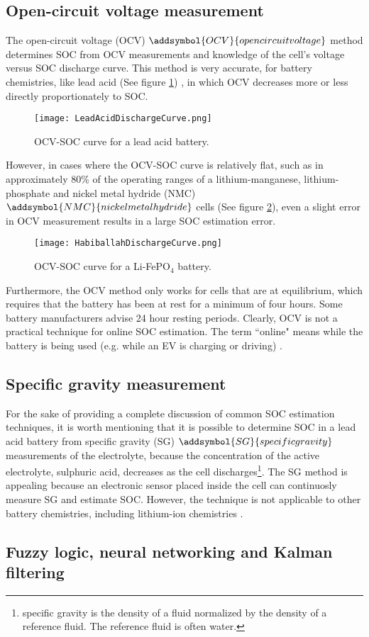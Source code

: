 		\subsection{Open-circuit voltage measurement}
The open-circuit voltage (OCV)  $\addsymbol{OCV}{open circuit voltage}$ method determines SOC from OCV measurements and knowledge of the cell's voltage versus SOC discharge curve.  This method is very accurate, for battery chemistries, like lead acid (See figure \ref{fig:LeadAcidDischargeCurve}) , in which OCV decreases more or less directly proportionately to SOC. 
\begin{figure}[H]
\centering
\texttt{[image: LeadAcidDischargeCurve.png]}
\caption{OCV-SOC curve for a lead acid battery.
\label{fig:LeadAcidDischargeCurve}
\cite{BUSOCDetermination}}
\end{figure}
However, in cases where the OCV-SOC curve is relatively flat, such as in approximately 80\% of the operating ranges of a lithium-manganese, lithium-phosphate and nickel metal hydride (NMC) $\addsymbol{NMC}{nickel metal hydride}$ cells \cite{MeasureSOC} (See figure \ref{fig:dischargeCurve}), even a slight error in OCV measurement results in a large SOC estimation error. 
\begin{figure}[H]
\centering
\texttt{[image: HabiballahDischargeCurve.png]}
\caption{OCV-SOC curve for a Li-FePO$_{4}$ battery.
\label{fig:dischargeCurve}
\cite[p.~8]{HabiballahRahimi-EichiUnnatiOhjaFedericoBaronti2013}}
\end{figure}
Furthermore, the OCV method only works for cells that are at equilibrium, which requires that the battery has been at rest for a minimum of four hours.  Some battery manufacturers advise 24 hour resting periods. Clearly, OCV is not a practical technique for online SOC estimation. The term ``online" means while the battery is being used (e.g. while an EV is charging or driving) \cite{HabiballahRahimi-EichiUnnatiOhjaFedericoBaronti2013}. 
		\subsection{Specific gravity measurement}
For the sake of providing a complete discussion of common SOC estimation techniques, it is worth mentioning that it is possible to determine SOC in a lead acid battery from specific gravity (SG) $\addsymbol{SG}{specific gravity}$ measurements of the electrolyte, because the concentration of the active electrolyte, sulphuric acid, decreases as the cell discharges\footnote{specific gravity is the density of a fluid normalized by the density of a reference fluid. The reference fluid is often water.}. The SG method is appealing because an electronic sensor placed inside the cell can continuosly measure SG and estimate SOC. However, the technique is not applicable to other battery chemistries, including lithium-ion chemistries \cite{BUSOCDetermination}.
		\subsection{Fuzzy logic, neural networking and Kalman filtering}
